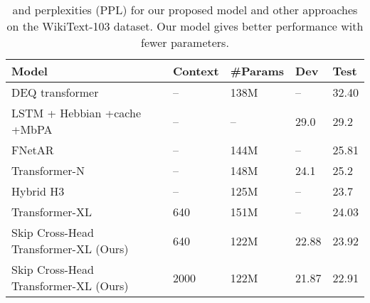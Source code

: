 \documentclass[11pt]{article}
\begin{document}
\begin{table*}
\centering
\begin{tabular}{lllll}
\hline
\textbf{Model} & \textbf{Context} & \textbf{\#Params} & \textbf{Dev} & \textbf{Test}\\
\hline

 DEQ transformer ~\citep{DBLP:conf/nips/BaiKK19} & -- & 138M & -- & 32.40  \\
 
LSTM + Hebbian +cache +MbPA ~\citep{DBLP:conf/icml/RaeDDL18} & -- & --  & 29.0 & 29.2  \\

FNetAR \citep{DBLP:journals/corr/abs-2107-10932} & -- & 144M & -- & 25.81 \\

Transformer-N \citep{DBLP:conf/naacl/SunI21} & -- & 148M &  24.1 & 25.2 \\

Hybrid H3 \citep{DBLP:journals/corr/abs-2212-14052} & -- & 125M & -- & 23.7 \\


\hline
 Transformer-XL~\citep{DBLP:conf/acl/DaiYYCLS19} & 640 & 151M  & --  & 24.03    \\
Skip Cross-Head Transformer-XL (Ours) & 640 & 122M & 22.88 & 23.92  \\
Skip Cross-Head Transformer-XL (Ours) & 2000 & 122M & 21.87  &  22.91 \\

\hline

\end{tabular}
\caption{
 and  perplexities (PPL) for our proposed model and other approaches on the WikiText-103 dataset. Our model gives better performance with fewer parameters.
}
\label{table:wt103}
\end{table*}
\end{document}
